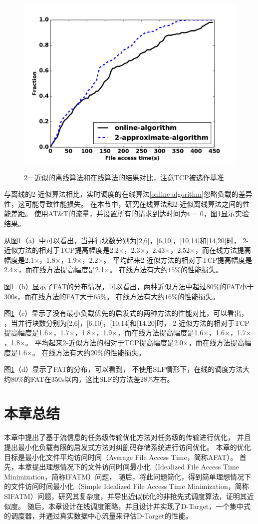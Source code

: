 \begin{figure}[h]
      {\includegraphics[width=0.5\columnwidth]{figures/DTARGET/picture/evaluation/ex3/online_offline2.pdf}}
  \caption{2－近似的离线算法和在线算法的结果对比，注意TCP被选作基准}
  \label{loss_fig}
\end{figure}


与离线的2-近似算法相比，实时调度的在线算法\ref{online-algorithm}忽略负载的差异性，这可能导致性能损失。
在本节中，研究在线算法和2-近似离线算法之间的性能差距。
使用AT\&T的流量，并设置所有的请求到达时间为t = 0，图\ref{loss_fig}显示实验结果。

从图\ref{loss_fig}（a）中可以看出，当并行块数分别为[2,6]，[6,10]，[10,14]和[14,20]时，
2-近似方法的相对于TCP提高幅度是2.2$\times$，2.3$\times$，2.43$\times$，2.52$\times$，而在线方法提高幅度是2.1$\times$，1.8$\times$，1.9$\times$，2.2$\times$。
平均起来2-近似方法的相对于TCP提高幅度是2.4$\times$，而在线方法提高幅度是2.1$\times$。
在线方法有大约$15\%$的性能损失。

图\ref{loss_fig}（b）显示了FAT的分布情况，可以看出，两种近似方法中超过$80\%$的FAT小于300s，而在线方法的FAT大于$65\%$。
在线方法有大约$16\%$的性能损失。

图\ref{loss_fig}（c）显示了没有最小负载优先的启发式的两种方法的性能对比，可以看出，
，当并行块数分别为[2,6]，[6,10]，[10,14]和[14,20]时，
2-近似方法的相对于TCP提高幅度是1.6$\times$，1.7$\times$，1.8$\times$，1.9$\times$，而在线方法提高幅度是1.6$\times$，1.6$\times$，1.7$\times$，1.8$\times$。
平均起来2-近似方法的相对于TCP提高幅度是2.0$\times$，而在线方法提高幅度是1.6$\times$。
在线方法有大约$20\%$的性能损失。

图\ref{loss_fig}（d）显示了FAT的分布，可以看到，
不使用SLF情形下，在线的调度方法大约$80\%$的FAT在350s以内，这比SLF的方法差$28\%$左右。

\section{本章总结}
本章中提出了基于流信息的任务级传输优化方法对任务级的传输进行优化，
并且提出最小化负载有限的启发式方法对纠删码存储系统进行访问优化。 
本章的优化目标是最小化文件平均访问时间（Average File Access Time，简称AFAT）。 
首先，本章提出理想情况下的文件访问时间最小化（Idealized File Access Time Minimization，简称IFATM）问题，
随后，将此问题简化，得到简单理想情况下的文件访问时间最小化（Simple Idealized File Access Time Minimization，简称SIFATM）问题，研究其复杂度，并导出近似优化的非抢先式调度算法，证明其近似度。
随后，本章设计在线调度策略，并且设计并实现了D-Target，一个集中式的调度器，并通过真实数据中心流量来评估D-Target的性能。
